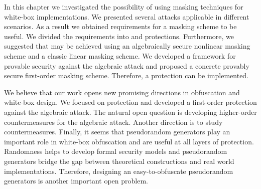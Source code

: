 
In this chapter we investigated the possibility of using masking techniques for white-box implementations. We presented several attacks applicable in different scenarios. As a result we obtained requirements for a masking scheme to be useful. We divided the requirements into \VH{} and \SH{} protections. Furthermore, we suggested that \VH{} may be achieved using an algebraically secure nonlinear masking scheme and a classic linear masking scheme. We developed a framework for provable security against the algebraic attack and proposed a concrete provably secure first-order masking scheme. Therefore, a \VH{} protection can be implemented. 

We believe that our work opens new promising directions in obfuscation and white-box design. We focused on \VH{} protection and developed a first-order protection against the algebraic attack. The natural open question is developing higher-order countermeasures for the algebraic attack. Another direction is to study \SH{} countermeasures. Finally, it seems that pseudorandom generators play an important role in white-box obfuscation and are useful at all layers of protection. Randomness helps to develop formal security models and pseudorandom generators bridge the gap between theoretical constructions and real world implementations. Therefore, designing an easy-to-obfuscate pseudorandom generators is another important open problem.